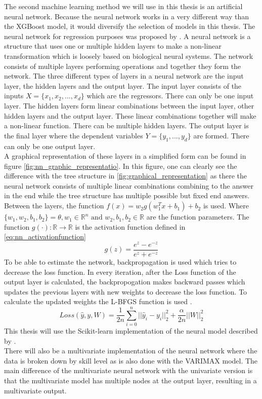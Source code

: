 The second machine learning method we will use in this thesis is an artificial neural network. Because the neural network works in a very different way than the XGBoost model, it would diversify the selection of models in this thesis. The neural network for regression purposes was proposed by \cite{Specht1991ANetwork}. A neural network is a structure that uses one or multiple hidden layers to make a non-linear transformation which is loosely based on biological neural systems. The network consists of multiple layers performing operations and together they form the network. The three different types of layers in a neural network are the input layer, the hidden layers and the output layer. The input layer consists of the inputs $X = \{x_1, x_2, ..., x_d\}$ which are the regressors. There can only be one input layer. The hidden layers form linear combinations between the input layer, other hidden layers and the output layer. These linear combinations together will make a non-linear function. There can be multiple hidden layers. The output layer is the final layer where the dependent variables $Y = \{y_1, ..., y_d\}$ are formed. There can only be one output layer.\\

A graphical representation of these layers in a simplified form can be found in figure \eqref{fig:nn_graphic_representatio}. In this figure, one can clearly see the difference with the tree structure in \eqref{fig:graphical_representation} as there the neural network consists of multiple linear combinations combining to the answer in the end while the tree structure has multiple possible but fixed end answers. Between the layers, the function $f(x) = w_2 g(w_1^T x + b_1) + b_2$ is used. Where $\{w_1, w_2, b_1, b_2\} = \theta, w_1 \in \mathbb{R}^n \text{ and } w_2, b_1, b_2 \in \mathbb{R}$ are the function parameters. The function $g(\cdot): \mathbb{R} \to \mathbb{R}$ is the activation function defined in \eqref{eq:nn_activationfunction}
\begin{equation}
\label{eq:nn_activationfunction}
    g(z) = \frac{e^z - e^{-z}}{e^z + e^{-z}}
\end{equation}
To be able to estimate the network, backpropagation is used which tries to decrease the loss function. In every iteration, after the Loss function of the output layer is calculated, the backpropogation makes backward passes which updates the previous layers with new weights to decrease the loss function. To calculate the updated weights the L-BFGS function is used \citep{Liu1989OnOptimalization}.
\begin{equation}
    Loss(\hat{y}, y, W) = \frac{1}{2n} \sum\limits_{i=0}^n ||\hat{y}_i - y_i||^2_2 + \frac{\alpha}{2n} ||W||^2_2
\end{equation}
This thesis will use the Scikit-learn implementation of the neural model described by \cite{Pedregosa2011Scikit-learn:Python}.\\

There will also be a multivariate implementation of the neural network where the data is broken down by skill level as is also done with the VARIMAX model. The main difference of the multivariate neural network with the univariate version is that the multivariate model has multiple nodes at the output layer, resulting in a multivariate output.